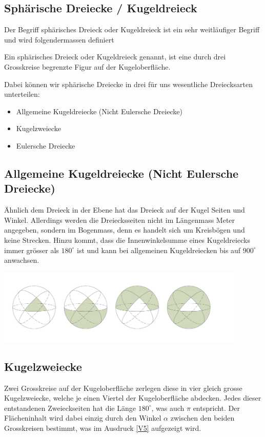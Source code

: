 \begin{refsection}
\section{Sphärische Dreiecke / Kugeldreieck}
Der Begriff sphärisches Dreieck oder Kugeldreieck ist ein sehr weitläufiger Begriff und wird folgendermassen definiert

\begin{definition}
Ein sphärisches Dreieck oder Kugeldreieck genannt, ist eine durch drei Grosskreise begrenzte Figur auf der Kugeloberfläche.
\end{definition} 

Dabei können wir sphärische Dreiecke in drei für uns wesentliche Dreiecksarten unterteilen:

\begin{itemize}
\item Allgemeine Kugeldreiecke (Nicht Eulersche Dreiecke)
\item Kugelzweiecke
\item Eulersche Dreiecke
\end{itemize}


\subsection{Allgemeine Kugeldreiecke (Nicht Eulersche Dreiecke)}
Ähnlich dem Dreieck in der Ebene hat das Dreieck auf der Kugel Seiten und Winkel. Allerdings werden die Dreiecksseiten nicht im Längenmass Meter angegeben, sondern im Bogenmass, denn es handelt sich um Kreisbögen und keine Strecken.
Hinzu kommt, dass die Innenwinkelsumme eines Kugeldreiecks immer grösser als $180^{\circ}$ ist und kann bei allgemeinen Kugeldreiecken bis auf $900^{\circ}$ anwachsen.


\begin{center}
        \includegraphics[width=0.9\textwidth]{kugel/Dreiecksarten.jpg}
\end{center}


\subsection{Kugelzweiecke} 
Zwei Grosskreise auf der Kugeloberfläche zerlegen diese in vier gleich grosse Kugelzweiecke, welche je einen Viertel der Kugeloberfläche abdecken. 
Jedes dieser entstandenen Zweieckseiten hat die Länge
$180^{\circ}$, was auch $\pi$ entspricht.
Der Flächeninhalt wird dabei einzig durch den Winkel $\alpha$ zwischen den beiden Grosskreisen bestimmt, was im Ausdruck \eqref{V5} aufgezeigt wird.


\end{refsection}
